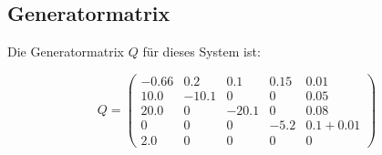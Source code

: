 \documentclass[a4paper,11pt]{article}
\theoremstyle{definition}
\begin{document}
    
    
    
    
    
    

\subsection{Generatormatrix}

Die Generatormatrix $Q$ für dieses System ist:

\[
Q = \begin{pmatrix}
-0.66 & 0.2 & 0.1 & 0.15 & 0.01 \\
10.0 & -10.1 & 0 & 0 & 0.05 \\
20.0 & 0 & -20.1 & 0 & 0.08 \\
0 & 0 & 0 & -5.2 & 0.1 + 0.01 \\
2.0 & 0 & 0 & 0 & 0
\end{pmatrix}
\]
\end{document}

